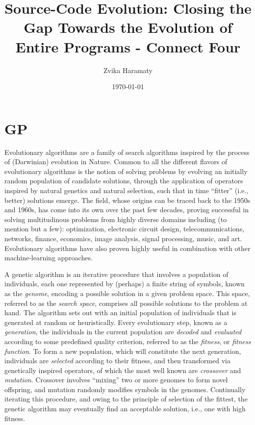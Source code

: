 \documentclass{article}
\title{Source-Code Evolution: Closing the Gap Towards the Evolution of Entire Programs - Connect Four}
\author{Zvika Haramaty}
\date{\today}
\begin{document}
\maketitle


\section{GP}
Evolutionary algorithms are a family of search algorithms inspired by the process of (Darwinian) evolution in Nature. Common to all the different flavors of evolutionary algorithms is the notion of solving problems by evolving an initially random population of candidate solutions, through the application of operators inspired by natural genetics and natural selection, such that in time ``fitter'' (i.e., better) solutions emerge. The field, whose origins can be traced back to the 1950s and 1960s, has come into its own over the past few decades, proving successful in solving multitudinous problems from highly diverse domains including (to mention but a few): optimization, electronic circuit design, telecommunications, networks, finance, economics, image analysis, signal processing, music, and art. Evolutionary algorithms have also proven highly useful in combination with other machine-learning approaches.

A genetic algorithm is an iterative procedure that involves a population of individuals, each one
represented by (perhaps) a finite string of symbols, known as the \emph{genome}, encoding a possible solution in a given problem space. This space, referred to as the \emph{search space}, comprises all possible solutions to the problem at hand. The algorithm sets out with an initial population of individuals that is generated at random or heuristically. Every evolutionary step, known as a \emph{generation}, the individuals in the current population are \emph{decoded} and \emph{evaluated} according to some predefined quality criterion, referred to as the \emph{fitness}, or \emph{fitness function}. To form a new population, which will constitute the next generation, individuals are \emph{selected} according to their fitness, and then transformed via genetically inspired operators, of which the most well known are \emph{crossover} and \emph{mutation}. Crossover involves ``mixing'' two or more genomes to form novel offspring, and mutation randomly modifies symbols in the genomes. Continually iterating this procedure, and owing to the principle of selection of the fittest, the genetic algorithm may eventually find an acceptable solution, i.e., one with high fitness.
\end{document}
